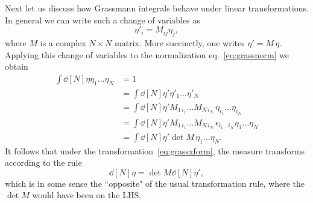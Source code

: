 Next let us discuss how Grassmann integrals behave under linear
transformations. In general we can write such a change of variables as
\begin{equation}\label{eq:grassxform}
  \eta'_i=M_{ij}\eta_j,
\end{equation}
where $M$ is a complex $N\times N$ matrix. More succinctly, one writes 
$\eta'=M\,\eta$. Applying this change of variables to the normalization
eq.~\eqref{eq:grassnorm} we obtain
\begin{equation}\begin{aligned}
  \int\dd[N]{\eta}\eta_1...\eta_N
     &=1\\
     &=\int\dd[N]{\eta'}\eta'_1...\eta'_N\\
     &=\int\dd[N]{\eta'}M_{1\,i_1}...M_{N\,i_N}\,\eta_{i_1}...\eta_{i_N}\\
     &=\int\dd[N]{\eta'}M_{1\,i_1}...M_{N\,i_N}\,\epsilon_{i_1...i_N}
               \eta_1...\eta_N\\
     &=\int\dd[N]{\eta'}\det M\,\eta_1...\eta_N.
\end{aligned}\end{equation}
It follows that under the transformation~\eqref{eq:grassxform}, the measure
transforms according to the rule
\begin{equation}
  \dd[N]{\eta}=\det M\dd[N]{\eta'},
\end{equation}
which is in some sense the ``opposite" of the usual transformation rule, where
the $\det M$ would have been on the LHS.

